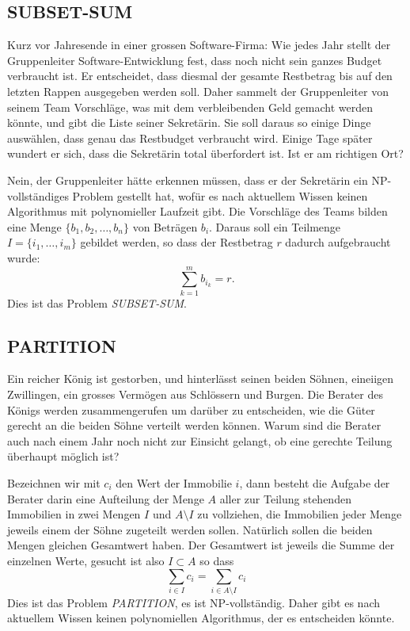 \subsection{SUBSET-SUM}
Kurz vor Jahresende in einer grossen Software-Firma: Wie jedes Jahr stellt
der Gruppenleiter Software-Entwicklung fest, dass noch nicht sein ganzes
Budget verbraucht ist.
Er entscheidet, dass diesmal der gesamte Restbetrag
bis auf den letzten Rappen
ausgegeben werden soll.
Daher sammelt der Gruppenleiter von seinem
Team Vorschläge, was mit dem verbleibenden Geld gemacht werden könnte,
und gibt die Liste seiner Sekretärin.
Sie soll daraus so einige Dinge
auswählen, dass genau das Restbudget verbraucht wird.
Einige Tage später
wundert er sich, dass die Sekretärin total überfordert ist.
Ist er
am richtigen Ort?

\medskip

Nein, der Gruppenleiter hätte erkennen müssen, dass er der Sekretärin
ein NP-vollständiges Problem gestellt hat, wofür es nach aktuellem
Wissen keinen Algorithmus mit polynomieller Laufzeit gibt.
Die Vorschläge
des Teams bilden eine Menge $\{b_1,b_2,\dots,b_n\}$ von Beträgen $b_i$.
Daraus soll ein Teilmenge $I=\{i_1,\dots,i_m\}$ gebildet werden, so dass
der Restbetrag $r$ dadurch aufgebraucht wurde:
\[
\sum_{k=1}^m b_{i_k} = r.
\]
Dies ist das Problem {\it SUBSET-SUM}.

\subsection{PARTITION}
Ein reicher König ist gestorben, und hinterlässt seinen beiden
Söhnen, eineiigen Zwillingen, ein grosses Vermögen aus Schlössern
und Burgen.
Die Berater des Königs werden zusammengerufen um
darüber zu entscheiden, wie die Güter gerecht an die beiden Söhne
verteilt werden können.
Warum sind die Berater auch nach einem Jahr
noch nicht zur Einsicht gelangt, ob eine gerechte Teilung überhaupt
möglich ist?

Bezeichnen wir mit $c_i$ den Wert der Immobilie $i$, dann besteht
die Aufgabe der Berater darin eine Aufteilung der Menge $A$ aller 
zur Teilung stehenden Immobilien in zwei Mengen $I$ und $A\setminus I$
zu vollziehen, die Immobilien jeder Menge jeweils einem der Söhne zugeteilt
werden sollen.
Natürlich sollen die beiden Mengen gleichen Gesamtwert haben.
Der Gesamtwert ist jeweils die Summe der einzelnen Werte, gesucht ist also
$I\subset A$ so dass
\[
\sum_{i\in I}c_i =\sum_{i\in A\setminus I}c_i
\]
Dies ist das Problem {\it PARTITION}, es ist NP-vollständig.
Daher gibt es nach aktuellem Wissen keinen polynomiellen Algorithmus,
der es entscheiden könnte.



